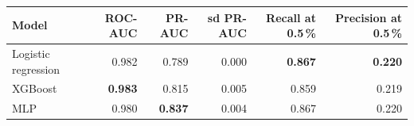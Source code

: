 \begin{tabular}{lrrrrr}
\toprule
Model & ROC-AUC & PR-AUC & sd PR-AUC & Recall at 0.5\,\% & Precision at 0.5\,\% \\
\midrule
Logistic regression & 0.982 & 0.789 & 0.000 & \textbf{0.867} & \textbf{0.220} \\
XGBoost & \textbf{0.983} & 0.815 & 0.005 & 0.859 & 0.219 \\
MLP & 0.980 & \textbf{0.837} & 0.004 & 0.867 & 0.220 \\
\bottomrule
\end{tabular}
